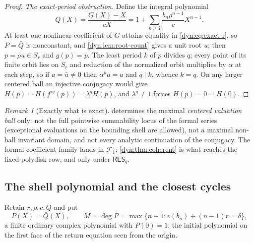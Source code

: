 \documentclass[11pt,letterpaper]{article}
\theoremstyle{definition}
\theoremstyle{remark}
\newtheorem{remark}[remark]{Remark}
\newcommand{\resq}{\mathsf{RES}_q}
\numberwithin{equation}{section}
\begin{document}
\begin{proof}
\emph{The exact-period obstruction.} Define the integral polynomial
\begin{equation}\label{dyn:eq:Q-shell}
 Q(X)=\frac{G(X)-X}{cX}=1+\sum_{n\ge2}\frac{b_n\rho^{n-1}}{c}X^{n-1}.
\end{equation}
At least one nonlinear coefficient of $G$ attains equality in
\eqref{dyn:eq:exact-r}, so $P=\bar Q$ is nonconstant, and
\cref{dyn:lem:root-count} gives a unit root $u$; then $p=\rho u\in S_r$ and
$g(p)=p$. The least period $k$ of $p$ divides $q$; every point of its
finite orbit lies on $S_r$ and reduction of the normalized orbit multiplies
by $\alpha$ at each step, so if $a=\bar u\ne0$ then $\alpha^{k}a=a$ and
$q\mid k$, whence $k=q$. On any larger centered ball an injective conjugacy
would give $H(p)=H(f^{\circ q}(p))=\lambda^{q}H(p)$, and $\lambda^{q}\ne1$
forces $H(p)=0=H(0)$.
\end{proof}

\begin{remark}[Exactly what is exact]\label{dyn:rem:exact-scope}
 determines the maximal \emph{centered valuation ball}
only: not the full pointwise summability locus of the formal series
(exceptional evaluations on the bounding shell are allowed), not a maximal
non-ball invariant domain, and not every analytic continuation of the
conjugacy. The formal-coefficient family lands in $\mathcal F_1$;
\cref{dyn:thm:coherent} is what reaches the fixed-polydisk row, and only
under $\resq$.
\end{remark}

\subsection{The shell polynomial and the closest cycles}
Retain $r,\rho,c,Q$ and put
\begin{equation}\label{dyn:eq:P}
 P(X)=\bar Q(X),\qquad
 M=\deg P=\max\{n-1:v(b_n)+(n-1)r=\delta\},
\end{equation}
a finite ordinary complex polynomial with $P(0)=1$: the initial polynomial
on the first face of the return equation seen from the origin.
\end{document}
